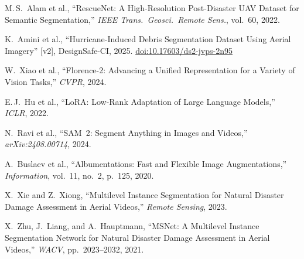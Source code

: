 \documentclass[10pt,a4paper,twocolumn]{article}
\begin{document}
\fontsize{7.5}{9.5}\selectfont
\setlength{\parskip}{2pt}

\noindent[1] M.\,S.\ Alam et al., ``RescueNet: A High-Resolution Post-Disaster UAV Dataset for Semantic Segmentation,'' \textit{IEEE Trans.\ Geosci.\ Remote Sens.}, vol.~60, 2022.

\noindent[2] K.\ Amini et al., ``Hurricane-Induced Debris Segmentation Dataset Using Aerial Imagery'' [v2], DesignSafe-CI, 2025. \href{https://doi.org/10.17603/ds2-jvps-2n95}{doi:10.17603/ds2-jvps-2n95}

\noindent[3] W.\ Xiao et al., ``Florence-2: Advancing a Unified Representation for a Variety of Vision Tasks,'' \textit{CVPR}, 2024.

\noindent[4] E.\,J.\ Hu et al., ``LoRA: Low-Rank Adaptation of Large Language Models,'' \textit{ICLR}, 2022.

\noindent[5] N.\ Ravi et al., ``SAM~2: Segment Anything in Images and Videos,'' \textit{arXiv:2408.00714}, 2024.

\noindent[6] A.\ Buslaev et al., ``Albumentations: Fast and Flexible Image Augmentations,'' \textit{Information}, vol.~11, no.~2, p.~125, 2020.

\noindent[7] X.\ Xie and Z.\ Xiong, ``Multilevel Instance Segmentation for Natural Disaster Damage Assessment in Aerial Videos,'' \textit{Remote Sensing}, 2023.

\noindent[8] X.\ Zhu, J.\ Liang, and A.\ Hauptmann, ``MSNet: A Multilevel Instance Segmentation Network for Natural Disaster Damage Assessment in Aerial Videos,'' \textit{WACV}, pp.~2023--2032, 2021.
\end{document}
